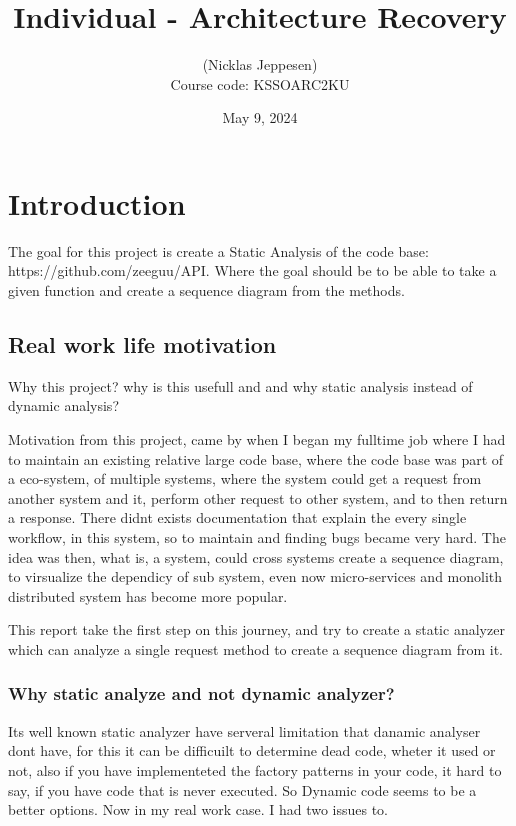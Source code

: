 \documentclass[12pt,a4paper]{report}
\title{Individual - Architecture Recovery}
\author{ (Nicklas Jeppesen) \\ Course code: KSSOARC2KU}
\date{May 9, 2024}
\begin{document}
	\maketitle
    \tableofcontents
    \listoffigures

    
    
    \chapter{Introduction}
    The goal for this project is create a Static Analysis of the code base: https://github.com/zeeguu/API. 
    Where the goal should be to be able to take a given function and create a sequence diagram from the methods. 


    \section{Real work life motivation}
    Why this project? why is this usefull and and why static analysis instead of dynamic analysis? 
    
    Motivation from this project, came by when I began my fulltime job where I had to maintain an existing relative large code base, where the code base was part of a eco-system, of multiple systems, where the system could get a request from another system and it, perform other request to other system, and to then return a response. There didnt exists documentation that explain the every single workflow, in this system, so to maintain and finding bugs became very hard. The idea was then, what is, a system, could cross systems create a sequence diagram, to virsualize the dependicy of sub system, even now micro-services and monolith distributed system has become more popular. 

    This report take the first step on this journey, and try to create a static analyzer which can analyze a single request method to create a sequence diagram from it. 

    \subsection*{Why static analyze and not dynamic analyzer?}
    Its well known static analyzer have serveral limitation that danamic analyser dont have, for this it can be difficuilt to determine dead code, wheter it used or not, also if you have implementeted the factory patterns in your code, it hard to say, if you have code that is never executed. So Dynamic code seems to be a better options. Now in my real work case. I had two issues to. 
\end{document}
